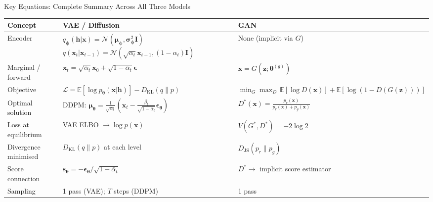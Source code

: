 \documentclass[aspectratio=169,11pt]{beamer}
\newcommand{\E}{\mathbb{E}}
\newcommand{\DKL}{D_{\mathrm{KL}}}
\newcommand{\Norm}{\mathcal{N}}
\newcommand{\ELBO}{\mathcal{L}}
\newcommand{\bx}{\bm{x}}
\newcommand{\bh}{\bm{h}}
\newcommand{\bz}{\bm{z}}
\newcommand{\beps}{\bm{\epsilon}}
\newcommand{\bmu}{\bm{\mu}}
\newcommand{\bsig}{\bm{\sigma}}
\newcommand{\btheta}{\bm{\theta}}
\newcommand{\bphi}{\bm{\phi}}
\newcommand{\pr}{p_{r}}           %
\newcommand{\pg}{p_{g}}           %
\newcommand{\JS}{D_{\mathrm{JS}}} %
\begin{document}
\begin{frame}{Key Equations: Complete Summary Across All Three Models}
\footnotesize
\begin{center}
\renewcommand{\arraystretch}{1.15}
\begin{tabular}{p{3.2cm}p{4.2cm}p{4.2cm}}
\toprule
\textbf{Concept} & \textbf{VAE / Diffusion} & \textbf{GAN}\\
\midrule
Encoder &
  $q_{\bphi}(\bh|\bx)=\Norm(\bmu_{\bphi},\bsig^2_{\bphi}\mathbf{I})$\newline
  $q(\bx_t|\bx_{t-1})=\Norm(\sqrt{\alpha_t}\bx_{t-1},(1-\alpha_t)\mathbf{I})$ &
  None (implicit via $G$) \\[4pt]
Marginal / forward &
  $\bx_t=\sqrt{\bar\alpha_t}\bx_0+\sqrt{1-\bar\alpha_t}\beps$ &
  $\bx=G(\bz;\btheta^{(g)})$ \\[4pt]
Objective &
  $\ELBO = \E[\log p_{\btheta}(\bx|\bh)] - \DKL(q\|p)$ &
  $\min_G\max_D\,\E[\log D(\bx)]+\E[\log(1-D(G(\bz)))]$ \\[4pt]
Optimal solution &
  DDPM: $\bmu_{\btheta}=\frac{1}{\sqrt{\alpha_t}}(\bx_t-\frac{\beta_t}{\sqrt{1-\bar\alpha_t}}\beps_{\btheta})$ &
  $D^*(\bx)=\frac{\pr(\bx)}{\pr(\bx)+\pg(\bx)}$ \\[4pt]
Loss at equilibrium &
  VAE ELBO $\to\log p(\bx)$ &
  $V(G^*,D^*)=-2\log 2$ \\[4pt]
Divergence minimised &
  $\DKL(q\|p)$ at each level &
  $\JS(\pr\|\pg)$ \\[4pt]
Score connection &
  $\bm{s}_{\btheta}=-\beps_{\btheta}/\sqrt{1-\bar\alpha_t}$ &
  $D^*\to$ implicit score estimator \\[4pt]
Sampling &
  1 pass (VAE); $T$ steps (DDPM) &
  1 pass \\[4pt]
\bottomrule
\end{tabular}
\end{center}
\end{frame}
\end{document}
